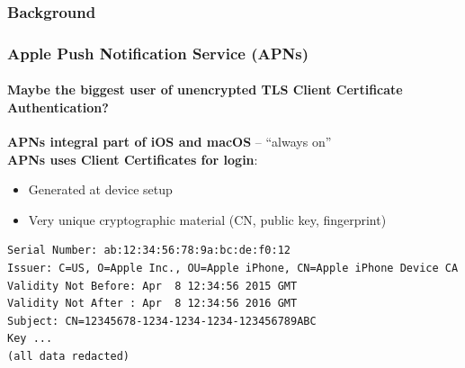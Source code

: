 \begin{frame}[fragile]
\frametitle{Background}

\end{frame}
\clearpage


\begin{frame}[fragile]
\frametitle{Apple Push Notification Service (APNs)}
\framesubtitle{Maybe the biggest user of unencrypted TLS Client Certificate Authentication?}

\textbf{APNs integral part of iOS and macOS} -- ``always on''\\

\textbf{APNs uses Client Certificates for login}:\\
\begin{itemize}
\item Generated at device setup
\item Very unique cryptographic material (CN, public key, fingerprint)
\end{itemize}

\begin{verbatim}
Serial Number: ab:12:34:56:78:9a:bc:de:f0:12
Issuer: C=US, O=Apple Inc., OU=Apple iPhone, CN=Apple iPhone Device CA
Validity Not Before: Apr  8 12:34:56 2015 GMT
Validity Not After : Apr  8 12:34:56 2016 GMT
Subject: CN=12345678-1234-1234-1234-123456789ABC
Key ...
(all data redacted)
\end{verbatim}
\end{frame}
\clearpage


